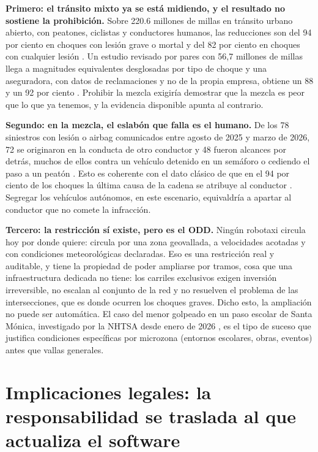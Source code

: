 \documentclass[11pt,letterpaper]{article}
\begin{document}
\textbf{Primero: el tránsito mixto ya se está midiendo, y el resultado no
sostiene la prohibición.} Sobre \num{220.6} millones de millas en tránsito
urbano abierto, con peatones, ciclistas y conductores humanos, las reducciones
son del 94 por ciento en choques con lesión grave o mortal y del 82 por ciento en
choques con cualquier lesión \parencite{waymoimpact2026}. Un estudio revisado por
pares con 56,7 millones de millas llega a magnitudes equivalentes desglosadas por
tipo de choque \parencite{kusano2025} y una aseguradora, con datos de
reclamaciones y no de la propia empresa, obtiene un 88 y un 92 por ciento
\parencite{dilillo2024}. Prohibir la mezcla exigiría demostrar que la mezcla es
peor que lo que ya tenemos, y la evidencia disponible apunta al contrario.

\textbf{Segundo: en la mezcla, el eslabón que falla es el humano.} De los 78
siniestros con lesión o airbag comunicados entre agosto de 2025 y marzo de 2026,
72 se originaron en la conducta de otro conductor y 48 fueron alcances por
detrás, muchos de ellos contra un vehículo detenido en un semáforo o cediendo el
paso a un peatón \parencite{lee2026}. Esto es coherente con el dato clásico de
que en el 94 por ciento de los choques la última causa de la cadena se atribuye
al conductor \parencite{singh2015}. Segregar los vehículos autónomos, en este
escenario, equivaldría a apartar al conductor que no comete la infracción.

\textbf{Tercero: la restricción sí existe, pero es el ODD.} Ningún robotaxi
circula hoy por donde quiere: circula por una zona geovallada, a velocidades
acotadas y con condiciones meteorológicas declaradas. Eso es una restricción real
y auditable, y tiene la propiedad de poder ampliarse por tramos, cosa que una
infraestructura dedicada no tiene: los carriles exclusivos exigen inversión
irreversible, no escalan al conjunto de la red y no resuelven el problema de las
intersecciones, que es donde ocurren los choques graves. Dicho esto, la
ampliación no puede ser automática. El caso del menor golpeado en un paso escolar
de Santa Mónica, investigado por la NHTSA desde enero de 2026
\parencite{cnbc2026}, es el tipo de suceso que justifica condiciones específicas
por microzona (entornos escolares, obras, eventos) antes que vallas generales.

\section{Implicaciones legales: la responsabilidad se traslada al que actualiza
el software}
\end{document}
